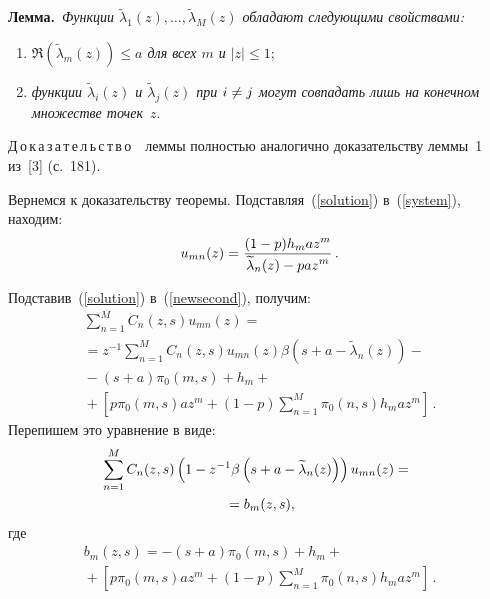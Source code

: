 \begin{multicols}{2}
\smallskip

\noindent
\textbf{Лемма.}\
\textit{Функции $\widetilde{\lambda}_1(z),\ldots,\widetilde{\lambda}_M(z)$
обладают следу\-ющи\-ми свойствами:}
\begin{enumerate}[(1)]
\item \textit{$\Re(\widetilde{\lambda}_m(z))\leq a$ для всех $m$ и $|z|\leq 1$};
\item \textit{функции $\widetilde{\lambda}_i(z)$ и $\widetilde{\lambda}_j(z)$ при
$i\hm\neq j$ могут совпадать лишь на конечном множестве точек}~$z$.
\end{enumerate}

\noindent
Д\,о\,к\,а\,з\,а\,т\,е\,л\,ь\,с\,т\,в\,о\ \ леммы
полностью аналогично доказательству леммы~1 из~[3] (с.~181).

\smallskip

Вернемся к доказательству теоремы. Под\-став\-ляя~(\ref{solution})
в~(\ref{system}), находим:
\begin{equation}
u_{mn}(z)=\displaystyle\frac{\displaystyle (1-p)h_m az^m\mathstrut}{\displaystyle \widetilde{\lambda}_n(z)-paz^m\mathstrut}\,.\label{eigenvectors}
\end{equation}

Подставив~(\ref{solution}) в~(\ref{newsecond}), получим:
\begin{multline*}
\sum\limits_{n=1}^{M}C_n(z,s)u_{mn}(z)={}\\
{}=
z^{-1}\sum\limits_{n=1}^{M}C_n(z,s)u_{mn}(z)
\beta(s+a-\widetilde{\lambda}_n(z))-{}\\
{}-(s+a)\pi_0(m,s)+h_m+{}\\
{}+\left[p\pi_0(m,s)az^m+(1-p)\sum\limits_{n=1}^{M}\pi_0(n,s)h_m az^m\right]\,.
\end{multline*}
Перепишем это уравнение в виде:
\begin{multline}
\hspace*{-2.96277pt}\sum\limits_{n=1}^{M}C_n(z,s)\left(1-z^{-1}\beta\left(s+a-\widetilde{\lambda}_n(z)\right)
\right)u_{mn}(z)={}\\
{}=b_m(z,s),\label{linear}
\end{multline}
где
\begin{multline*}
b_m (z,s)=-(s+a)\pi_0(m,s)+h_m+{}\\
{}+\left[p\pi_0(m,s)az^m+(1-p)
\sum\limits_{n=1}^{M}\pi_0(n,s)h_m az^m\right]\,.
\end{multline*}


\end{multicols}
